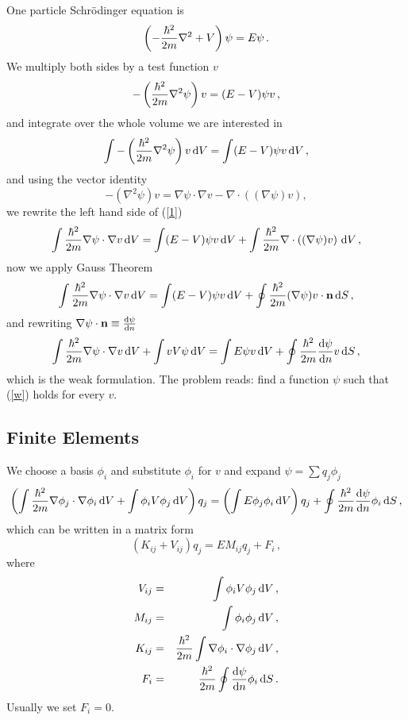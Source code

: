 One particle Schrödinger equation is 
\begin{equation*}
  \left(-{\hbar^2\over2m}\nabla^2 + V\right)\psi=E\psi\,.
\end{equation*}
We multiply both sides by a test function $v$
\begin{equation*}
  -\left({\hbar^2\over2m}\nabla^2\psi\right)v=(E-V)\psi v\,,
\end{equation*}
and integrate over the whole volume we are interested in 
\begin{equation}
  \int-\left({\hbar^2\over2m}\nabla^2\psi\right)v\,{\rm d} V=\int(E-V)\psi v\,{\rm d} V\,,  \label{1}
\end{equation}
and using the vector identity 
\begin{equation*}
  -\left(\nabla^2\psi\right)v=\nabla \psi\cdot \nabla v - \nabla\cdot\left((\nabla \psi)v\right),
\end{equation*}
we rewrite the left hand side of (\ref{1})
\begin{equation*}
  \int{\hbar^2\over2m}\nabla\psi\cdot\nabla v\,{\rm d} V=\int(E-V)\psi v\,{\rm d} V+\int{\hbar^2\over2m}\nabla\cdot\left((\nabla \psi)v\right)\,{\rm d} V\,,
\end{equation*}
now we apply Gauss Theorem 
\begin{equation*}
  \int{\hbar^2\over2m}\nabla\psi\cdot\nabla v\,{\rm d} V=\int(E-V)\psi v\,{\rm d} V+\oint{\hbar^2\over2m}(\nabla \psi)v\cdot{\bf n}\,{\rm d} S\,,
\end{equation*}
and rewriting $\nabla\psi\cdot{\bf n}\equiv{{\rm d}\psi\over{\rm d}n}$
\begin{equation}
  \int{\hbar^2\over2m}\nabla\psi\cdot\nabla v\,{\rm d} V+ \int vV\psi\,{\rm d} V = \int E\psi v\,{\rm d} V + \oint{\hbar^2\over2m}{{\rm d}\psi\over{\rm d}n}v\,{\rm d} S\,,  \label{w}
\end{equation}
which is the weak formulation. The problem reads: find a function $\psi$ such that (\ref{w}) holds for every $v$.

\subsection{Finite Elements}

We choose a basis $\phi_i$ and substitute $\phi_i$ for $v$ and expand $\psi=\sum q_j\phi_j$
\begin{equation}
  \left(\int{\hbar^2\over2m}\nabla\phi_j\cdot\nabla\phi_i\,{\rm d} V+ \int\phi_iV\phi_j\,{\rm d} V\right)q_j = \left(\int E\phi_j\phi_i\,{\rm d} V\right)q_j +\oint{\hbar^2\over2m}{{\rm d}\psi\over{\rm d}n}\phi_i\,{\rm d} S\,,  \label{fem}
\end{equation}
which can be written in a matrix form 
\begin{equation*}
  \left(K_{ij}+V_{ij}\right)q_j=EM_{ij}q_j+F_i\,,
\end{equation*}
where 
\begin{eqnarray*}
V_{ij}&=&\int\phi_iV\phi_j\,{\rm d} V\,, \\
M_{ij}&=&\int\phi_i\phi_j\,{\rm d} V\,, \\
K_{ij}&=&{\hbar^2\over2m}\int\nabla\phi_i\cdot\nabla\phi_j\,{\rm d} V\,, \\
F_i&=&{\hbar^2\over2m}\oint{{\rm d}\psi\over{\rm d}n}\phi_i\,{\rm d} S\,. \\
\end{eqnarray*}
 Usually we set $F_i=0$.

